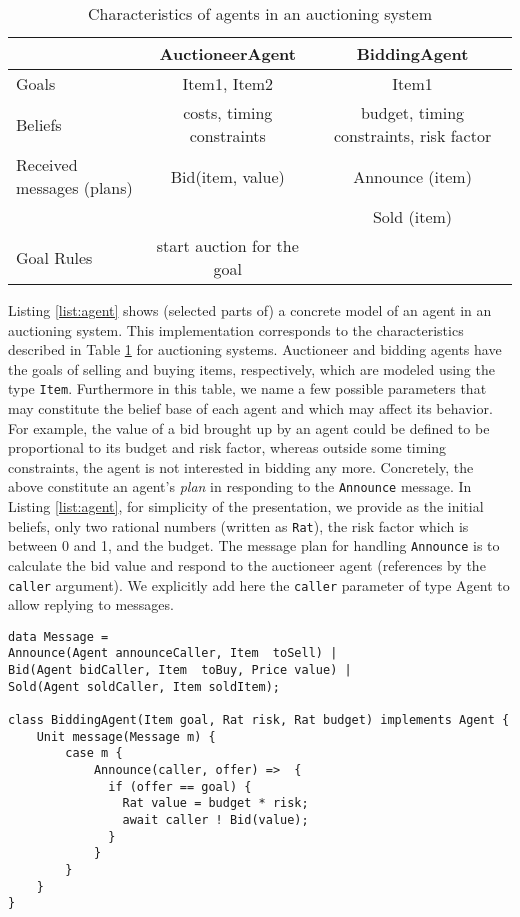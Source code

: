 




\begin{table}
	\caption{Characteristics of agents in an auctioning system}\label{tab:auc}
\begin{tabular}{|l|c|c|}
	\hline
	& AuctioneerAgent & BiddingAgent \\
	\hline
Goals & Item1, Item2 & Item1 \\
Beliefs & costs, timing constraints & budget, timing constraints, risk factor \\	
Received messages (plans) & Bid(item, value) & Announce (item) \\
 & & Sold (item) \\
Goal Rules & start auction for the goal & \\
\hline
\end{tabular}
\end{table}



Listing \ref{list:agent} shows (selected parts of) a concrete model of an agent  in an auctioning system.
This implementation corresponds to the characteristics described in Table \ref{tab:auc} for auctioning systems.
Auctioneer and bidding agents have the goals of selling and buying items, respectively, which are modeled using the type \lstinline|Item|. 
Furthermore in this table, we name a few possible parameters that may constitute the belief base of each agent and which may affect its behavior.
For example, the value of a bid brought up by an agent could be defined to be proportional to its budget and risk factor, whereas outside some timing constraints, the agent is not interested in bidding any more. 
Concretely, the above constitute an agent's {\em plan} in responding to the \lstinline|Announce| message.
In Listing \ref{list:agent}, for simplicity of the presentation, we provide as the initial beliefs, only two rational numbers (written as \lstinline|Rat|), the risk factor which is between 0 and 1, and the budget.
The message plan for handling \lstinline|Announce| is to calculate the bid value and respond to the auctioneer agent (references by the \lstinline|caller| argument).
We explicitly add here the \lstinline|caller| parameter of type Agent to allow replying to messages. 


\begin{lstlisting}[caption=Agents in an auctioning system, label=list:agent]
data Message = 
Announce(Agent announceCaller, Item  toSell) | 
Bid(Agent bidCaller, Item  toBuy, Price value) |
Sold(Agent soldCaller, Item soldItem);

class BiddingAgent(Item goal, Rat risk, Rat budget) implements Agent {
	Unit message(Message m) {
		case m {
			Announce(caller, offer) =>  {
			  if (offer == goal) {
			    Rat value = budget * risk;
			    await caller ! Bid(value);
			  } 
			}
		}
	}
}
\end{lstlisting}

